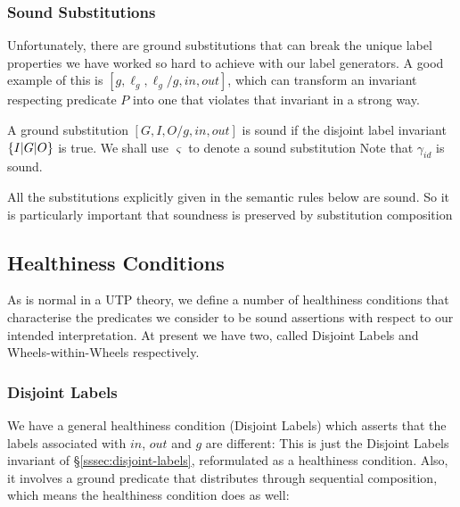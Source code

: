 \subsubsection{Sound Substitutions}

Unfortunately, there are ground substitutions
that can break the unique label properties
we have worked so hard to achieve with our label generators.
A good example of this is $[g,\ell_g,\ell_g/g,in,out]$,
which can transform an invariant respecting predicate $P$
into one that violates that invariant in a strong way.

A ground substitution $[G,I,O/g,in,out]$ is sound
if the disjoint label invariant $\{{I|G|O}\}$ is true.
We shall use $\varsigma$ to denote a sound substitution
Note that $\gamma_{id}$ is sound.

All the substitutions explicitly given in the semantic rules below
are sound.
So it is particularly important that soundness is preserved by
substitution composition




\subsection{Healthiness Conditions}

As is normal in a UTP theory,
we define a number of healthiness conditions
that characterise the predicates we consider to be sound assertions
with respect to our intended interpretation.
At present we have two, called Disjoint Labels
and Wheels-within-Wheels respectively.

\subsubsection{Disjoint Labels}\label{sssec:disj-labels}

We have a general healthiness condition (Disjoint Labels) which asserts that
the labels associated with $in$, $out$ and $g$ are different:
 This is just the Disjoint Labels invariant of
\S\ref{sssec:disjoint-labels}, reformulated as a healthiness condition. Also,
it involves a ground predicate that distributes through sequential composition,
which means the healthiness condition does as well:

